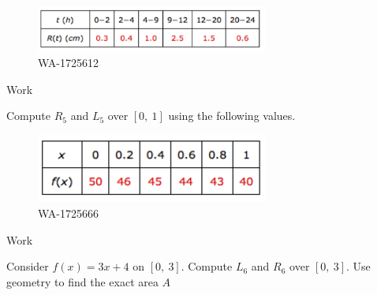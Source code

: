 \documentclass[12pt,addpoints, answers, fleqn]{exam}
\begin{document}
\begin{teacher}
\begin{questions}
\begin{figure}[htbp] %
   \centering
   \includegraphics[width=3in]{./graphics/1725612.pdf} 
   \caption{WA-1725612}
   \label{fig:1725612}
\end{figure}
\begin{solution}
Work
\end{solution}
 
\question 	%

Compute $R_5$ and $L_5$ over $\left[0, \ 1 \right]$ using the following values.
 
 \begin{figure}[htbp] %
   \centering
   \includegraphics[width=3in]{./graphics/1725666.pdf} 
   \caption{WA-1725666}
   \label{fig:1725666}
\end{figure}

\begin{solution}
Work
\end{solution}

\question 	%

Consider $f\left(x\right) = 3x + 4$ on $\left[0, \ 3 \right]$. Compute $L_6$ and $R_6$ over $\left[0, \ 3 \right]$. Use geometry to find the exact area $A$

 

\end{questions}
\end{teacher}
\end{document}
